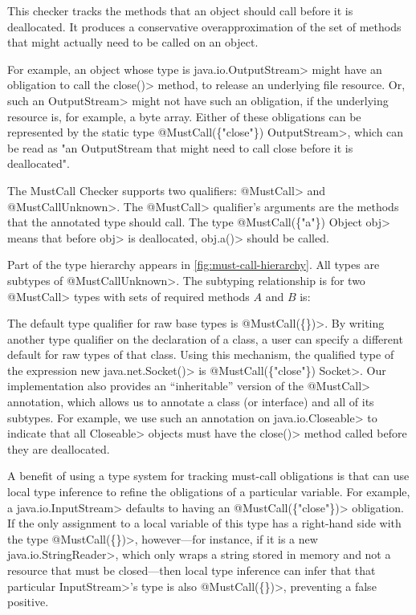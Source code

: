 This checker tracks the methods that an object should call before it
is deallocated. It produces a conservative overapproximation of the
set of methods that might actually need to be called on an object.

For example, an object whose type is \<java.io.OutputStream> might
have an obligation to call the \<close()> method, to release an
underlying file resource. Or, such an \<OutputStream> might not have
such an obligation, if the underlying resource is, for example, a byte
array. Either of these obligations can be represented by the static
type \<@MustCall(\{"close"\}) OutputStream>, which can be read as "an
OutputStream that might need to call close before it is deallocated".

The MustCall Checker supports two qualifiers: \<@MustCall> and
\<@MustCallUnknown>. The \<@MustCall> qualifier's arguments are the
methods that the annotated type should call. The type
\<@MustCall(\{"a"\}) Object obj> means that before \<obj> is
deallocated, \<obj.a()> should be called.

Part of the type hierarchy appears in \cref{fig:must-call-hierarchy}.
All types are subtypes of \<@MustCallUnknown>.
The subtyping relationship is for two \<@MustCall> types with sets
of required methods $A$ and $B$ is:

The default type qualifier for raw base types is \<@MustCall(\{\})>.
By writing another type qualifier on the declaration of a class, a
user can specify a different default for raw types of that class.
Using this mechanism, the qualified type of the expression \<new
java.net.Socket()> is \<@MustCall(\{"close"\}) Socket>. Our implementation
also provides an ``inheritable'' version of the \<@MustCall> annotation,
which allows us to annotate a class (or interface) and all of its subtypes.
For example, we use such an annotation on \<java.io.Closeable> to indicate
that all \<Closeable> objects must have the \<close()> method called before
they are deallocated.

A benefit of using a type system for tracking must-call obligations is
that \tool can use local type inference to refine the obligations of
a particular variable. For example, a \<java.io.InputStream>
defaults to having an \<@MustCall(\{"close"\})> obligation. If the only
assignment to a local variable of this type has a right-hand side with
the type \<@MustCall(\{\})>, however---for instance, if it is a new
\<java.io.StringReader>, which only wraps a string stored in memory
and not a resource that must be closed---then local type inference can
infer that that particular \<InputStream>'s type is also \<@MustCall(\{\})>,
preventing a false positive.

